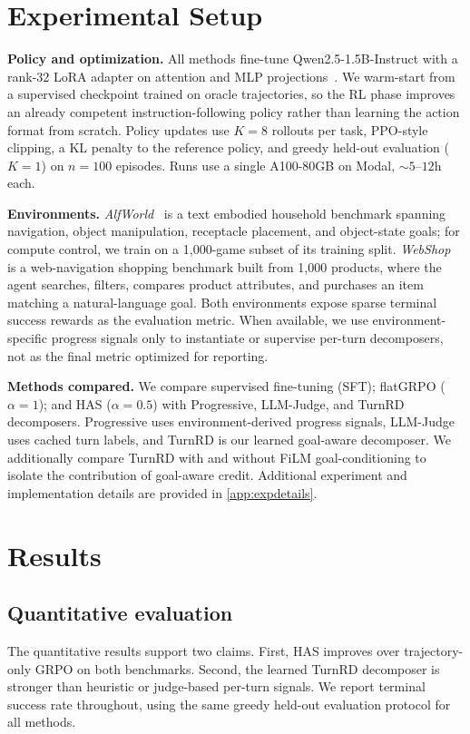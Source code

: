 \documentclass{article}
\begin{document}
\section{Experimental Setup}
\label{sec:setup}
\textbf{Policy and optimization.} All methods fine-tune Qwen2.5-1.5B-Instruct with a rank-32
LoRA adapter on attention and MLP projections~\citep{hu2022lora}. We warm-start from a
supervised checkpoint trained on oracle trajectories, so the RL phase improves an already
competent instruction-following policy rather than learning the action format from scratch.
Policy updates use $K{=}8$ rollouts per task, PPO-style clipping, a KL penalty to the reference
policy, and greedy held-out evaluation ($K{=}1$) on $n{=}100$ episodes. Runs use a single
A100-80GB on Modal, ${\sim}5$--$12$h each.

\textbf{Environments.} \emph{AlfWorld}~\citep{shridhar2021alfworld} is a text embodied
household benchmark spanning navigation, object manipulation, receptacle placement, and
object-state goals; for compute control, we train on a 1{,}000-game subset of its training
split. \emph{WebShop}~\citep{yao2022webshop} is a
web-navigation shopping benchmark built from 1{,}000 products, where the agent searches,
filters, compares product attributes, and purchases an item matching a natural-language goal.
Both environments expose sparse terminal success rewards as the evaluation metric. When
available, we use environment-specific progress signals only to instantiate or supervise
per-turn decomposers, not as the final metric optimized for reporting.

\textbf{Methods compared.} We compare supervised fine-tuning (SFT); flatGRPO ($\alpha{=}1$);
and HAS ($\alpha{=}0.5$) with Progressive, LLM-Judge, and TurnRD decomposers. Progressive uses
environment-derived progress signals, LLM-Judge uses cached turn labels, and TurnRD is our
learned goal-aware decomposer. We additionally compare TurnRD with and without FiLM
goal-conditioning to isolate the contribution of goal-aware credit. Additional experiment and
implementation details are provided in \ref{app:expdetails}.

\section{Results}
\label{sec:results}

\subsection{Quantitative evaluation}
The quantitative results support two claims. First, HAS improves over trajectory-only GRPO on
both benchmarks. Second, the learned TurnRD decomposer is stronger than heuristic or judge-based
per-turn signals. We report terminal success rate throughout, using the same greedy held-out
evaluation protocol for all methods.
\end{document}
